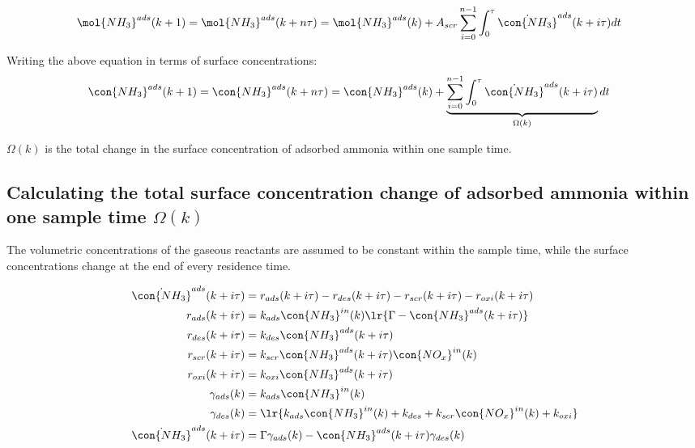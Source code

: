 \begin{align*}
    \mol{NH_3}^{ads}(k + 1) = \mol{NH_3}^{ads} (k + n\tau) &= \mol{NH_3}^{ads} (k) + A_{scr} \sum_{i=0}^{n-1} \int_{0}^{\tau} \dot{\con{NH_3}}^{ads} (k + i\tau) dt
\end{align*}

Writing the above equation in terms of surface concentrations:
\begin{align*}
    \con{NH_3}^{ads}(k + 1) = \con{NH_3}^{ads} (k + n\tau) &= \con{NH_3}^{ads} (k) + \underbrace{\sum_{i=0}^{n-1} \int_{0}^{\tau} \dot{\con{NH_3}}^{ads} (k + i\tau)}_{\Omega(k)}   dt
\end{align*}

$\Omega(k)$ is the total change in the surface concentration of adsorbed ammonia
within one sample time.

\subsection{Calculating the total surface concentration change of adsorbed ammonia within one sample time $\Omega(k)$}

The volumetric concentrations of the gaseous reactants are assumed to be
constant within the sample time, while the surface concentrations change at the
end of every residence time.

\begin{align*}
    \dot{\con{NH_3}}^{ads} (k + i\tau) &= r_{ads} (k + i \tau) - r_{des} (k + i \tau) - r_{scr} (k + i \tau) - r_{oxi} (k + i \tau)\\
    r_{ads} (k + i \tau) &= k_{ads} \con{NH_3}^{in}(k) \lr{\Gamma - \con{NH_3}^{ads} (k + i \tau)}\\
    r_{des} (k + i \tau) &= k_{des} \con{NH_3}^{ads}(k + i \tau)\\
    r_{scr} (k + i \tau) &= k_{scr} \con{NH_3}^{ads}(k + i \tau) \con{NO_x}^{in}(k)\\
    r_{oxi} (k + i \tau) &= k_{oxi} \con{NH_3}^{ads}(k + i \tau)\\
    \gamma_{ads} (k) &= k_{ads} \con{NH_3}^{in}(k)\\
    \gamma_{des} (k) &= \lr{k_{ads} \con{NH_3}^{in}(k) + k_{des} + k_{scr} \con{NO_x}^{in}(k) + k_{oxi}}\\
    \dot{\con{NH_3}}^{ads} (k + i\tau) &= \Gamma \gamma_{ads} (k) - \con{NH_3}^{ads} (k + i \tau) \gamma_{des} (k)
\end{align*}

